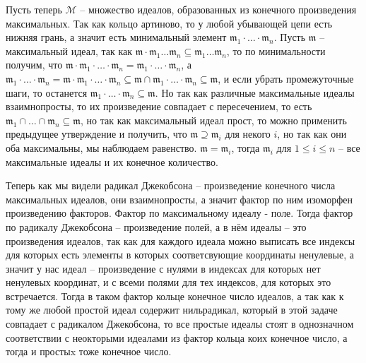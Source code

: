 \documentclass{article}
\begin{document}
\begin{enumerate}
        Пусть теперь $\mathcal{M}$ – множество идеалов, образованных из
        конечного произведения максимальных. Так как кольцо артиново, то у любой
        убывающей цепи есть нижняя грань, а значит есть минимальный элемент
        $\mathfrak{m}_1\cdot\ldots\cdot\mathfrak{m}_n$. Пусть $\mathfrak{m}$ –
        максимальный идеал, так как $\mathfrak{m}\cdot\mathfrak{m}_1\ldots\mathfrak{m}_n
        \subseteq\mathfrak{m}_1\ldots\mathfrak{m}_n$, то по минимальности получим,
        что $\mathfrak{m}\cdot\mathfrak{m}_1\cdot\ldots\cdot\mathfrak{m}_n=\mathfrak{m}_1
        \cdot\ldots\cdot\mathfrak{m}_n$, а $\mathfrak{m}_1\cdot\ldots\cdot\mathfrak{m}_n=\mathfrak{m}
        \cdot\mathfrak{m}_1\cdot\ldots\cdot\mathfrak{m}_n\subseteq\mathfrak{m}\cap
        \mathfrak{m}_1\cdot\ldots\cdot\mathfrak{m}_n\subseteq\mathfrak{m}$, и
        если убрать промежуточные шаги, то останется $\mathfrak{m}_1\cdot\ldots
        \cdot\mathfrak{m}_n\subseteq\mathfrak{m}$. Но так как различные
        максимальные идеалы взаимнопросты, то их произведение совпадает с
        пересечением, то есть $\mathfrak{m}_1\cap\ldots\cap\mathfrak{m}_n
        \subseteq\mathfrak{m}$, но так как максимальный идеал прост, то можно
        применить предыдущее утверждение и получить, что $\mathfrak{m}\supseteq
        \mathfrak{m}_i$ для некого $i$, но так как они оба максимальны, мы
        наблюдаем равенство. $\mathfrak{m}=\mathfrak{m}_i$, тогда $\mathfrak{m}_i$
        для $1\leq i\leq n$ – все максимальные идеалы и их конечное количество.

        Теперь как мы видели радикал Джекобсона – произведение конечного числа
        максимальных идеалов, они взаимнопросты, а значит фактор по ним изоморфен
        произведению факторов. Фактор по максимальному идеалу - поле. Тогда
        фактор по радикалу Джекобсона – произведение полей, а в нём идеалы –
        это произведения идеалов, так как для каждого идеала можно выписать
        все индексы для которых есть элементы в которых соответсвующие координаты
        ненулевые, а значит у нас идеал – произведение с нулями в индексах для
        которых нет ненулевых координат, и с всеми полями для тех индексов, для
        которых это встречается. Тогда в таком фактор кольце конечное число
        идеалов, а так как к тому же любой простой идеал содержит нильрадикал,
        который в этой задаче совпадает с радикалом Джекобсона, то все простые
        идеалы стоят в однозначном соответствии с неокторыми идеалами из фактор
        кольца коих конечное число, а тогда и простыx тоже конечное число.


\end{enumerate}
\end{document}
